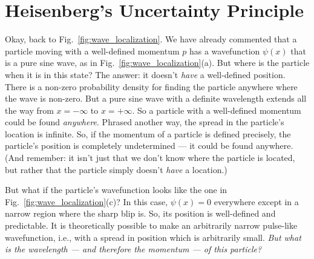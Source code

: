 \section{Heisenberg's Uncertainty Principle}
\label{sec:heisenberg_principle}

Okay, back to Fig.~\ref{fig:wave_localization}. We have already
commented that a particle moving with a well-defined momentum
$p$ has a wavefunction $\psi(x)$ that is a pure sine wave, as in
Fig.~\ref{fig:wave_localization}(a).  But where is the particle when
it is in this state? The answer: it doesn't {\it have} a well-defined
position.  There is a non-zero probability density for finding the
particle anywhere where the wave is non-zero. But a pure sine wave with
a definite wavelength extends all the way from $x = -\infty$ to $x =
+\infty$. So a particle with a well-defined momentum could be found {\it
anywhere}. Phrased another way, the spread in the particle's location
is infinite.  So, if the momentum of a particle is defined precisely,
the particle's position is completely undetermined --- it could be found
anywhere. (And remember: it isn't just that we don't know where the
particle is located, but rather that the particle simply doesn't {\it
have} a location.)

But what if the particle's wavefunction looks like the one in
Fig.~\ref{fig:wave_localization}(c)? In this case, $\psi(x) = 0$
everywhere except in a narrow region where the sharp blip is. So, its
position is well-defined and predictable. It is theoretically possible to
make an arbitrarily narrow pulse-like wavefunction, i.e., with a spread
in position which is arbitrarily small.  {\it But what is the wavelength
--- and therefore the momentum --- of this particle?}


